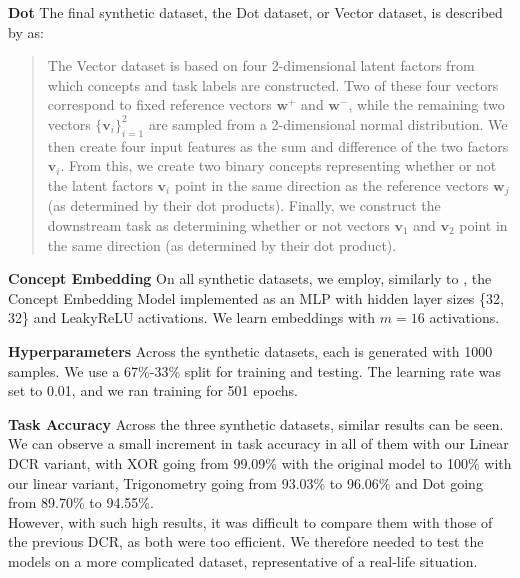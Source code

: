\documentclass[sigconf, nonacm]{acmart}
\begin{document}
\textbf{Dot} The final synthetic dataset, the Dot dataset, or Vector dataset, is described by \citet{barbiero2023interpretable} as:
\begin{quote}
The Vector dataset is based on four 2-dimensional latent factors from which concepts and task labels are constructed. Two of these four vectors correspond to fixed reference vectors \( \mathbf{w}^+ \) and \( \mathbf{w}^- \), while the remaining two vectors \( \{ \mathbf{v}_i \}_{i=1}^2 \) are sampled from a 2-dimensional normal distribution. We then create four input features as the sum and difference of the two factors \( \mathbf{v}_i \). From this, we create two binary concepts representing whether or not the latent factors \( \mathbf{v}_i \) point in the same direction as the reference vectors \( \mathbf{w}_j \) (as determined by their dot products). Finally, we construct the downstream task as determining whether or not vectors \( \mathbf{v}_1 \) and \( \mathbf{v}_2 \) point in the same direction (as determined by their dot product).
\end{quote} \vspace{8pt}

\textbf{Concept Embedding} On all synthetic datasets, we employ, similarly to \citet{barbiero2023interpretable}, the Concept Embedding Model \citep{espinosa2022concept} implemented as an MLP with hidden layer sizes \{32, 32\} and LeakyReLU activations. We learn embeddings with \( m = 16 \) activations. \vspace{8pt}

\textbf{Hyperparameters} Across the synthetic datasets, each is generated with 1000 samples. We use a 67\%-33\% split for training and testing. The learning rate was set to 0.01, and we ran training for 501 epochs. \vspace{8pt}

\textbf{Task Accuracy} Across the three synthetic datasets, similar results can be seen. We can observe a small increment in task accuracy in all of them with our Linear DCR variant, with XOR going from 99.09\% with the original model to 100\% with our linear variant, Trigonometry going from 93.03\% to 96.06\% and Dot going from 89.70\% to 94.55\%.\\
However, with such high results, it was difficult to compare them with those of the previous DCR, as both were too efficient. We therefore needed to test the models on a more complicated dataset, representative of a real-life situation.\vspace{8pt}
\end{document}
